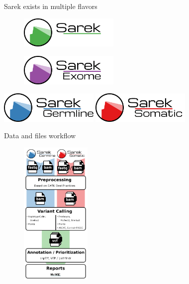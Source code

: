 \documentclass[usepdftitle=false]{beamer}
\begin{document}
\begin{frame}{Sarek exists in multiple flavors}
	\begin{figure}
		\includegraphics[height=1.5cm]{pictures/Sarek}
	\end{figure}
	\pause
	\begin{figure}
		\includegraphics[height=1.5cm]{pictures/Sarek_exome}
	\end{figure}
	\vfill
	\pause
	\begin{center}
		\includegraphics[height=1.5cm]{pictures/Sarek_germline}
		\hfill
		\includegraphics[height=1.5cm]{pictures/Sarek_somatic}
	\end{center}
\end{frame}

\begin{frame}{Data and files workflow}
	\begin{figure}
		\includegraphics[height=7cm]{pictures/Sarek_workflow_2-3}
	\end{figure}
\end{frame}
\end{document}
